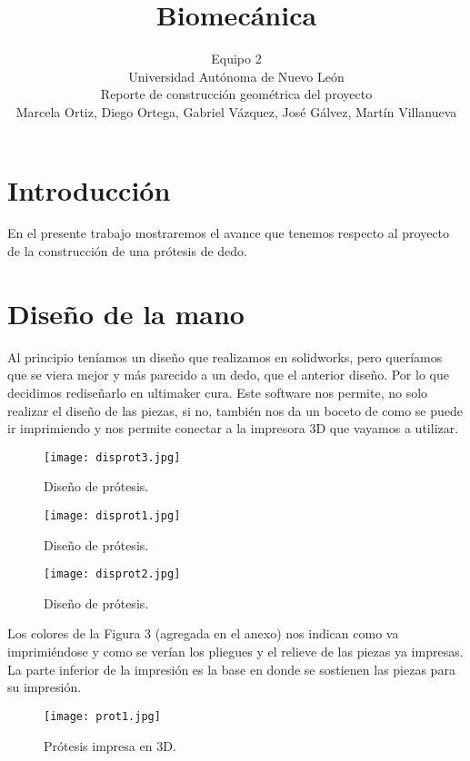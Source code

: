 \documentclass[a4paper]{article}
\title{Biomecánica}
\author{Equipo 2\\
  \small Universidad Autónoma de Nuevo León\\
  \small Reporte de construcción geométrica del proyecto\\
  \small Marcela Ortiz, Diego Ortega, Gabriel Vázquez, José Gálvez, Martín Villanueva\\
  \date{}
}
\begin{document}
\maketitle

\section{Introducci\'on}
En el presente trabajo mostraremos el avance que tenemos respecto al proyecto de la construcción de una prótesis de dedo. 


\section{Diseño de la mano}

Al principio teníamos un diseño que realizamos en solidworks, pero queríamos que se viera mejor y más parecido a un dedo, que el anterior diseño. Por lo que decidimos rediseñarlo en ultimaker cura. Este software nos permite, no solo realizar el diseño de las piezas, si no, también nos da un boceto de como se puede ir imprimiendo y nos permite conectar a la impresora 3D que vayamos a utilizar.

\begin{figure}[h]
\centering
\texttt{[image: disprot3.jpg]}
\caption{\label{fig:biomec1}Diseño de prótesis.}
\end{figure}

\newline

\begin{figure}[h]
\centering
\texttt{[image: disprot1.jpg]}
\caption{\label{fig:biomec1}Diseño de prótesis.}
\end{figure}


\begin{figure}[h]
\centering
\texttt{[image: disprot2.jpg]}
\caption{\label{fig:biomec1}Diseño de prótesis.}
\end{figure}

Los colores de la Figura 3 (agregada en el anexo) nos indican como va imprimiéndose y como se verían los pliegues y el relieve de las piezas ya impresas. 
La parte inferior de la impresión es la base en donde se sostienen las piezas para su impresión.

\begin{figure}[H]
\centering
\texttt{[image: prot1.jpg]}
\caption{\label{fig:biomec1}Prótesis impresa en 3D.}
\end{figure}
\end{document}
